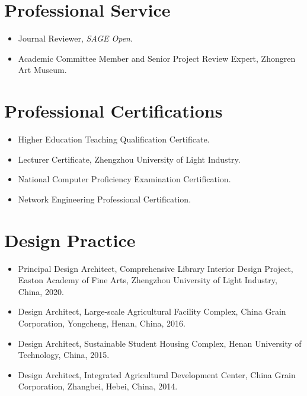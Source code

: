 \documentclass[11pt,a4paper]{article}
\begin{document}
\section*{Professional Service}
\begin{itemize}
  \item Journal Reviewer, \textit{SAGE Open}.
  \item Academic Committee Member and Senior Project Review Expert, Zhongren Art Museum.
\end{itemize}

\section*{Professional Certifications}
\begin{itemize}
  \item Higher Education Teaching Qualification Certificate.
  \item Lecturer Certificate, Zhengzhou University of Light Industry.
  \item National Computer Proficiency Examination Certification.
  \item Network Engineering Professional Certification.
\end{itemize}

\section*{Design Practice}
\begin{itemize}
  \item Principal Design Architect, Comprehensive Library Interior Design Project, Easton Academy of Fine Arts, Zhengzhou University of Light Industry, China, 2020.
  \item Design Architect, Large-scale Agricultural Facility Complex, China Grain Corporation, Yongcheng, Henan, China, 2016.
  \item Design Architect, Sustainable Student Housing Complex, Henan University of Technology, China, 2015.
  \item Design Architect, Integrated Agricultural Development Center, China Grain Corporation, Zhangbei, Hebei, China, 2014.
\end{itemize}
\end{document}
